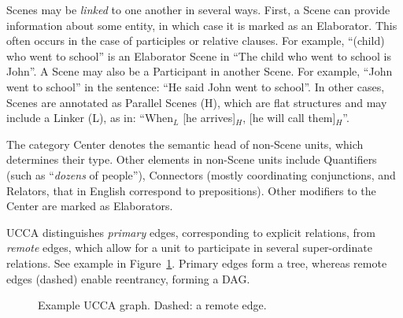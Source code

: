\documentclass[11pt,a4paper]{article}
\begin{document}
  Scenes may be \textit{linked} to one another in several ways.
  First, a Scene can provide information about some entity,
  in which case it is marked as an Elaborator.
  This often occurs in the case of participles or relative clauses.
  For example, ``(child) who went to school'' is an Elaborator Scene
  in ``The child who went to school is John''.
  A Scene may also be a Participant in another Scene. For example, ``John went to school'' in the sentence: ``He said John went to school''. 
  In other cases, Scenes are annotated as Parallel Scenes (H), which are flat structures and may include a Linker (L), 
  as in:  ``When$_L$ [he arrives]$_H$, [he will call them]$_H$''.

  The category Center denotes the semantic head of non-Scene units,
  which determines their type. 
  Other elements in non-Scene units include Quantifiers (such as ``{\it dozens} of people''), Connectors (mostly
  coordinating conjunctions, and Relators, that in English correspond to prepositions).
  Other modifiers to the Center are marked as Elaborators.
  
  UCCA distinguishes \textit{primary} edges, corresponding 
  to explicit relations, from \textit{remote} edges,
  which allow for a unit to participate
  in several super-ordinate relations.
  See example in Figure~\ref{fig:example_ucca}.
  Primary edges form a tree, whereas remote edges (dashed) enable reentrancy, forming a DAG.

\begin{figure}[th]
  \centering
\caption{\label{fig:example_ucca}
 Example UCCA graph. Dashed: a remote edge.}
\end{figure}
\end{document}
